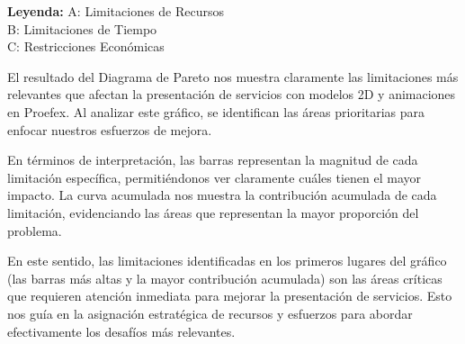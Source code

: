 \textbf{Leyenda:}
A: Limitaciones de Recursos \\
B: Limitaciones de Tiempo \\
C: Restricciones Económicas

\newpage

El resultado del Diagrama de Pareto nos muestra claramente las limitaciones más
relevantes que afectan la presentación de servicios con modelos 2D y animaciones
en Proefex. Al analizar este gráfico, se identifican las áreas prioritarias para
enfocar nuestros esfuerzos de mejora.

En términos de interpretación, las barras representan la magnitud de cada limitación
específica, permitiéndonos ver claramente cuáles tienen el mayor impacto. La curva
acumulada nos muestra la contribución acumulada de cada limitación, evidenciando 
las áreas que representan la mayor proporción del problema.

En este sentido, las limitaciones identificadas en los primeros lugares del 
gráfico (las barras más altas y la mayor contribución acumulada) son las áreas 
críticas que requieren atención inmediata para mejorar la presentación de
servicios. Esto nos guía en la asignación estratégica de recursos y esfuerzos
para abordar efectivamente los desafíos más relevantes.

